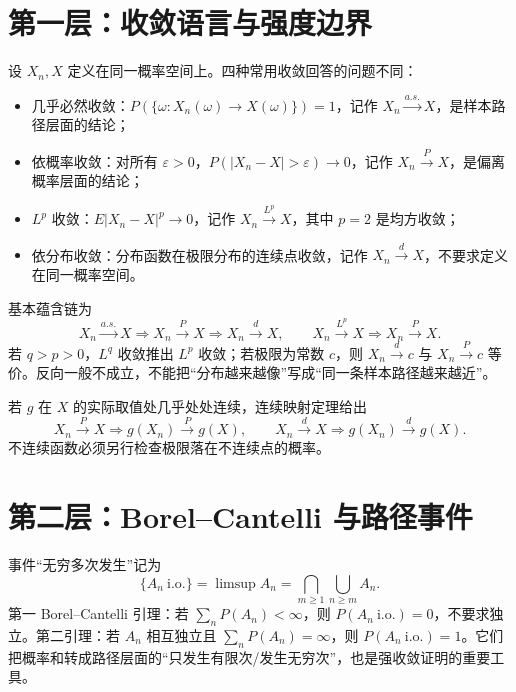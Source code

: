 \documentclass[11pt,a4paper]{ctexart}
\newenvironment{handbookdiagram}{\par\vspace{0.4em}\noindent\begin{center}}{\end{center}\vspace{0.4em}}
\begin{document}
\section{第一层：收敛语言与强度边界}

设 $X_n,X$ 定义在同一概率空间上。四种常用收敛回答的问题不同：
\begin{itemize}
  \item 几乎必然收敛：$P(\{\omega:X_n(\omega)\to X(\omega)\})=1$，记作 $X_n\xrightarrow{a.s.}X$，是样本路径层面的结论；
  \item 依概率收敛：对所有 $\varepsilon>0$，$P(\lvert X_n-X\rvert>\varepsilon)\to0$，记作 $X_n\xrightarrow{P}X$，是偏离概率层面的结论；
  \item $L^p$ 收敛：$E\lvert X_n-X\rvert^p\to0$，记作 $X_n\xrightarrow{L^p}X$，其中 $p=2$ 是均方收敛；
  \item 依分布收敛：分布函数在极限分布的连续点收敛，记作 $X_n\xrightarrow{d}X$，不要求定义在同一概率空间。
\end{itemize}
基本蕴含链为
\[
X_n\xrightarrow{a.s.}X\Longrightarrow X_n\xrightarrow{P}X\Longrightarrow X_n\xrightarrow{d}X,
\qquad X_n\xrightarrow{L^p}X\Longrightarrow X_n\xrightarrow{P}X.
\]
若 $q>p>0$，$L^q$ 收敛推出 $L^p$ 收敛；若极限为常数 $c$，则 $X_n\xrightarrow{d}c$ 与 $X_n\xrightarrow{P}c$ 等价。反向一般不成立，不能把“分布越来越像”写成“同一条样本路径越来越近”。

若 $g$ 在 $X$ 的实际取值处几乎处处连续，连续映射定理给出
\[
X_n\xrightarrow{P}X\Rightarrow g(X_n)\xrightarrow{P}g(X),\qquad
X_n\xrightarrow{d}X\Rightarrow g(X_n)\xrightarrow{d}g(X).
\]
不连续函数必须另行检查极限落在不连续点的概率。

\begin{handbookdiagram}
\resizebox{0.92\linewidth}{!}{%
%
}
\end{handbookdiagram}

\section{第二层：Borel--Cantelli 与路径事件}

事件“无穷多次发生”记为
\[
\{A_n\ \mathrm{i.o.}\}=\limsup A_n=\bigcap_{m\geq1}\bigcup_{n\geq m}A_n.
\]
第一 Borel--Cantelli 引理：若 $\sum_nP(A_n)<\infty$，则 $P(A_n\ \mathrm{i.o.})=0$，不要求独立。第二引理：若 $A_n$ 相互独立且 $\sum_nP(A_n)=\infty$，则 $P(A_n\ \mathrm{i.o.})=1$。它们把概率和转成路径层面的“只发生有限次/发生无穷次”，也是强收敛证明的重要工具。
\end{document}
